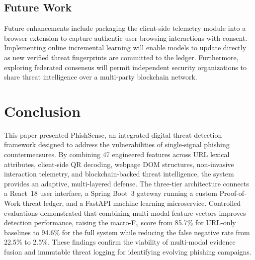 \documentclass[conference]{IEEEtran}
\begin{document}
\subsection{Future Work}
Future enhancements include packaging the client-side telemetry module into a browser extension
to capture authentic user browsing interactions with consent.
Implementing online incremental learning will enable models to update directly as new verified threat
fingerprints are committed to the ledger.
Furthermore, exploring federated consensus will permit independent security organizations to share
threat intelligence over a multi-party blockchain network.

\section{Conclusion}

This paper presented PhishSense, an integrated digital threat detection framework designed to
address the vulnerabilities of single-signal phishing countermeasures.
By combining 47 engineered features across URL lexical attributes, client-side QR decoding,
webpage DOM structures, non-invasive interaction telemetry, and blockchain-backed threat intelligence,
the system provides an adaptive, multi-layered defense.
The three-tier architecture connects a React~18 user interface, a Spring Boot~3 gateway running a
custom Proof-of-Work threat ledger, and a FastAPI machine learning microservice.
Controlled evaluations demonstrated that combining multi-modal feature vectors improves detection
performance, raising the macro-F$_1$ score from 85.7\% for URL-only baselines to 94.6\% for the full
system while reducing the false negative rate from 22.5\% to 2.5\%.
These findings confirm the viability of multi-modal evidence fusion and immutable threat logging
for identifying evolving phishing campaigns.
\end{document}

